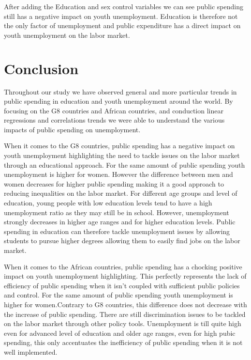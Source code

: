 \documentclass[
  letterpaper,
  DIV=11,
  numbers=noendperiod]{scrartcl}
\begin{document}
After adding the Education and sex control variables we can see public
spending still has a negative impact on youth unemployment. Education is
therefore not the only factor of unemployment and public expenditure has
a direct impact on youth unemployment on the labor market.

\hypertarget{conclusion}{%
\section{Conclusion}\label{conclusion}}

Throughout our study we have observed general and more particular trends
in public spending in education and youth unemployment around the world.
By focusing on the G8 countries and African countries, and conduction
linear regressions and correlations trends we were able to understand
the various impacts of public spending on unemployment.

When it comes to the G8 countries, public spending has a negative impact
on youth unemployment highlighting the need to tackle issues on the
labor market through an educational approach. For the same amount of
public spending youth unemployment is higher for women. However the
difference between men and women decreases for higher public spending
making it a good approach to reducing inequalities on the labor market.
For different age groups and level of education, young people with low
education levels tend to have a high unemployment ratio as they may
still be in school. However, unemployment strongly decreases in higher
age ranges and for higher education levels. Public spending in education
can therefore tackle unemployment issues by allowing students to pursue
higher degrees allowing them to easily find jobs on the labor market.

When it comes to the African countries, public spending has a chocking
positive impact on youth unemployment highlighting. This perfectly
represents the lack of efficiency of public spending when it isn't
coupled with sufficient public policies and control. For the same amount
of public spending youth unemployment is higher for women.Contrary to G8
countries, this difference does not decrease with the increase of public
spending. There are still discrimination issues to be tackled on the
labor market through other policy tools. Unemployment is till quite high
even for advanced level of education and older age ranges, even for high
pubic spending, this only accentuates the inefficiency of public
spending when it is not well implemented.
\end{document}
